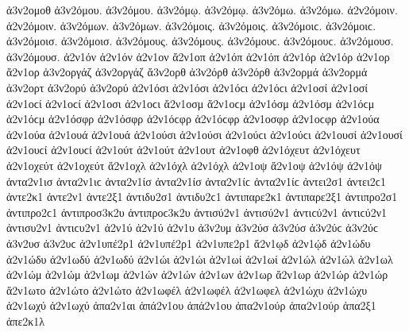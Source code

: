 {ἀ3ν2ομοθ   %
ἀ3ν2όμου. ἀ3ν2όμου.   %
ἀ3ν2όμῳ. ἀ3ν2όμῳ. 
ἀ3ν2όμω. ἀ3ν2όμω. 
ἀ2ν2όμοιν. ἀ2ν2όμοιν. 
ἀ3ν2όμων. ἀ3ν2όμων. 
ἀ3ν2όμοις. ἀ3ν2όμοις. ἀ3ν2όμοιϲ. ἀ3ν2όμοιϲ. 
ἀ3ν2όμοισ. ἀ3ν2όμοισ. 
ἀ3ν2όμους. ἀ3ν2όμους. ἀ3ν2όμουϲ. ἀ3ν2όμουϲ. 
ἀ3ν2όμουσ. ἀ3ν2όμουσ. 
ἀ2ν1όν ἀ2ν1όν   %
ἀ2ν1ον 
ἄ2ν1οπ   %
ἀ2ν1όπ ἀ2ν1όπ 
ἀ2ν1όρ ἀ2ν1όρ   %
ἀ2ν1ορ 
ἄ2ν1ορ   %
ἀ3ν2οργάζ ἀ3ν2οργάζ   %
ἄ3ν2ορθ   %
ἀ3ν2όρθ ἀ3ν2όρθ 
ἀ3ν2ορμά ἀ3ν2ορμά   %
ἀ3ν2ορτ   %
ἀ3ν2ορύ ἀ3ν2ορύ   %
ἀ2ν1όσι ἀ2ν1όσι ἀ2ν1όϲι ἀ2ν1όϲι   %
ἀ2ν1οσί ἀ2ν1οσί ἀ2ν1οϲί ἀ2ν1οϲί 
ἀ2ν1οσι ἀ2ν1οϲι   %
ἄ2ν1οσμ ἄ2ν1οϲμ   %
ἀ2ν1όσμ ἀ2ν1όσμ ἀ2ν1όϲμ ἀ2ν1όϲμ 
ἀ2ν1όσφρ ἀ2ν1όσφρ ἀ2ν1όϲφρ ἀ2ν1όϲφρ   %
ἀ2ν1οσφρ ἀ2ν1οϲφρ 
ἀ2ν1ούα ἀ2ν1ούα   %
ἀ2ν1ουά ἀ2ν1ουά 
ἀ2ν1ούσι ἀ2ν1ούσι ἀ2ν1ούϲι ἀ2ν1ούϲι   %
ἀ2ν1ουσί ἀ2ν1ουσί ἀ2ν1ουϲί ἀ2ν1ουϲί 
ἀ2ν1ούτ ἀ2ν1ούτ   %
ἀ2ν1ουτ 
ἀ2ν1οφθ   %
ἀ2ν1όχευτ ἀ2ν1όχευτ   %
ἀ2ν1οχεύτ ἀ2ν1οχεύτ 
ἄ2ν1οχλ   %
ἀ2ν1όχλ ἀ2ν1όχλ 
ἀ2ν1οψ   %
ἄ2ν1οψ   %
ἀ2ν1όψ ἀ2ν1όψ 
ἀντα2ν1ισ ἀντα2ν1ιϲ   %
ἀντα2ν1ίσ ἀντα2ν1ίσ ἀντα2ν1ίϲ ἀντα2ν1ίϲ   %
ἀντει2σ1 ἀντει2ϲ1   %
ἀντε2κ1   %
ἀντε2ν1   %
ἀντε2ξ1   %
ἀντιδυ2σ1 ἀντιδυ2ϲ1   %
ἀντιπαρε2κ1   %
ἀντιπαρε2ξ1   %
ἀντιπρο2σ1 ἀντιπρο2ϲ1   %
ἀντιπροσ3κ2υ ἀντιπροϲ3κ2υ   %
ἀντισύ2ν1 ἀντισύ2ν1 ἀντιϲύ2ν1 ἀντιϲύ2ν1   %
ἀντισυ2ν1 ἀντιϲυ2ν1 
ἀ2ν1ύ ἀ2ν1ύ   %
ἀ2ν1υ 
ἀ3ν2υμ   %
ἀ3ν2ύσ ἀ3ν2ύσ ἀ3ν2ύϲ ἀ3ν2ύϲ   %
ἀ3ν2υσ ἀ3ν2υϲ   %
ἀ2ν1υπέ2ρ1 ἀ2ν1υπέ2ρ1   %
ἀ2ν1υπε2ρ1 
ἄ2ν1ῳδ   %
ἀ2ν1ῴδ 
ἀ2ν1ώδυ ἀ2ν1ώδυ   %
ἀ2ν1ωδύ ἀ2ν1ωδύ   %
ἀ2ν1ώι ἀ2ν1ώι   %
ἀ2ν1ωί ἀ2ν1ωί 
ἀ2ν1ώλ ἀ2ν1ώλ   %
ἀ2ν1ωλ 
ἀ2ν1ώμ ἀ2ν1ώμ   %
ἀ2ν1ωμ 
ἀ2ν1ών ἀ2ν1ών   %
ἀ2ν1ων 
ἀ2ν1ωρ   %
ἄ2ν1ωρ   %
ἀ2ν1ώρ ἀ2ν1ώρ 
ἄ2ν1ωτο   %
ἀ2ν1ώτο ἀ2ν1ώτο 
ἀ2ν1ωφέλ ἀ2ν1ωφέλ   %
ἀ2ν1ωφελ   %
ἀ2ν1ώχυ ἀ2ν1ώχυ   %
ἀ2ν1ωχύ ἀ2ν1ωχύ 
ἀπα2ν1αι   %
ἀπά2ν1ου ἀπά2ν1ου   %
ἀπα2ν1ούρ ἀπα2ν1ούρ 
ἁπα2ξ1   %
ἀπε2κ1λ   %
}
